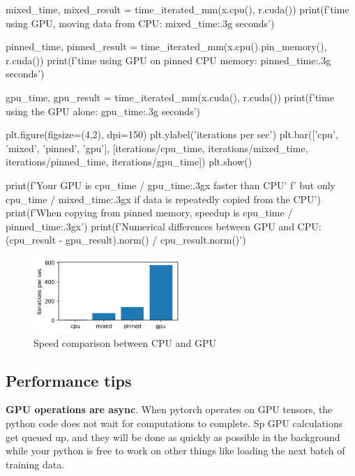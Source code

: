 \begin{itemize}
\begin{exampleblock}
\begin{codeblock}[language=python]
mixed_time, mixed_result = time_iterated_mm(x.cpu(), r.cuda())
print(f'time using GPU, moving data from CPU: {mixed_time:.3g} seconds')

pinned_time, pinned_result = time_iterated_mm(x.cpu().pin_memory(), r.cuda())
print(f'time using GPU on pinned CPU memory: {pinned_time:.3g} seconds')

gpu_time, gpu_result = time_iterated_mm(x.cuda(), r.cuda())
print(f'time using the GPU alone: {gpu_time:.3g} seconds')

plt.figure(figsize=(4,2), dpi=150)
plt.ylabel('iterations per sec')
plt.bar(['cpu', 'mixed', 'pinned', 'gpu'],
        [iterations/cpu_time,
            iterations/mixed_time,
            iterations/pinned_time,
            iterations/gpu_time])
plt.show()

print(f'Your GPU is {cpu_time / gpu_time:.3g}x faster than CPU'
        f' but only {cpu_time / mixed_time:.3g}x if data is repeatedly copied from the CPU')
print(f'When copying from pinned memory, speedup is {cpu_time / pinned_time:.3g}x')
print(f'Numerical differences between GPU and CPU: {(cpu_result - gpu_result).norm() / cpu_result.norm()}')
        \end{codeblock}
    \end{exampleblock}

    \begin{figure}[H]
        \centering
        \includegraphics[width=0.5\textwidth]{assets/fig4.png}
        \caption{Speed comparison between CPU and GPU}
    \end{figure}
\end{itemize}

\subsection{Performance tips}

\textbf{GPU operations are async}. When pytorch operates on GPU tensors, the python code does not wait for computations to complete. Sp GPU calculations get queued up, and they will be done as quickly as possible in the background while your python is free to work on other things like loading the next batch of training data.

